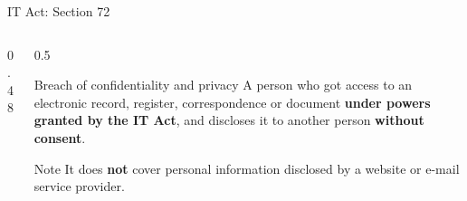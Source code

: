 \documentclass[aspectratio=169,11pt,xcolor={table}]{beamer}
\begin{document}
\begin{frame}{IT Act: Section 72}
  \begin{columns}[c]
    \begin{column}{0.48\textwidth}
      \centering
    \end{column}
    \begin{column}{0.5\textwidth}
      \begin{block}{Breach of confidentiality and privacy}
        \small A person who got access to an electronic record, register, correspondence or document \textbf{under powers granted by the IT Act}, and discloses it to another person \textbf{without consent}.
      \end{block}
      \begin{alertblock}{Note}
        \small It does \textbf{not} cover personal information disclosed by a website or e-mail service provider.
      \end{alertblock}
    \end{column}
  \end{columns}
\end{frame}
\end{document}
